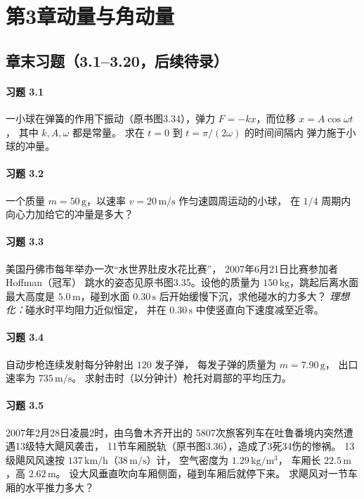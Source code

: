 \section*{第3章\quad 动量与角动量}
\subsection*{章末习题（3.1--3.20，后续待录）}

\paragraph{习题 3.1}
一小球在弹簧的作用下振动（原书图3.34），弹力
\(F=-kx\)，而位移 \(x=A\cos\omega t\)，
其中 \(k,A,\omega\) 都是常量。
求在 \(t=0\) 到 \(t=\pi/(2\omega)\) 的时间间隔内
弹力施于小球的冲量。

\paragraph{习题 3.2}
一个质量 \(m=50\,\mathrm g\)，以速率
\(v=20\,\mathrm{m/s}\) 作匀速圆周运动的小球，
在 \(1/4\) 周期内向心力加给它的冲量是多大？

\paragraph{习题 3.3}
美国丹佛市每年举办一次“水世界肚皮水花比赛”，
2007年6月21日比赛参加者 Hoffman（冠军）
跳水的姿态见原书图3.35。设他的质量为
\(150\,\mathrm{kg}\)，跳起后离水面最大高度是
\(5.0\,\mathrm m\)，碰到水面 \(0.30\,\mathrm s\)
后开始缓慢下沉，求他碰水的力多大？
\textit{理想化：}碰水时平均阻力近似恒定，
并在 \(0.30\,\mathrm s\) 中使竖直向下速度减至近零。

\paragraph{习题 3.4}
自动步枪连续发射每分钟射出 \(120\) 发子弹，
每发子弹的质量为 \(m=7.90\,\mathrm g\)，
出口速率为 \(735\,\mathrm{m/s}\)。
求射击时（以分钟计）枪托对肩部的平均压力。

\paragraph{习题 3.5}
2007年2月28日凌晨2时，由乌鲁木齐开出的
5807次旅客列车在吐鲁番境内突然遭遇13级特大飓风袭击，
11节车厢脱轨（原书图3.36），造成了3死34伤的惨祸。
13级飓风风速按 \(137\,\mathrm{km/h}\)（\(38\,\mathrm{m/s}\)）计，
空气密度为 \(1.29\,\mathrm{kg/m^3}\)，
车厢长 \(22.5\,\mathrm m\)，高 \(2.62\,\mathrm m\)。
设大风垂直吹向车厢侧面，碰到车厢后就停下来。
求飓风对一节车厢的水平推力多大？

